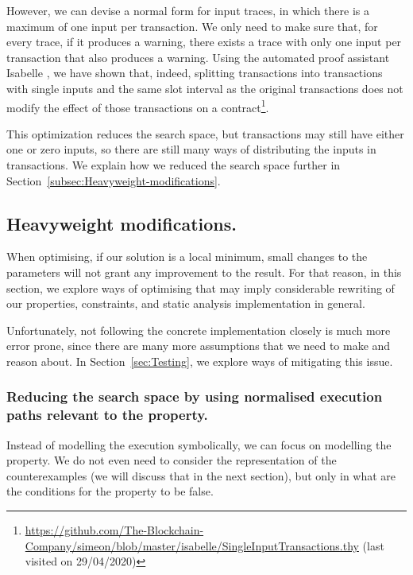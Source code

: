 \documentclass[english,runningheads]{llncs}
\begin{document}
However, we can devise a normal form for input traces, in which there
is a maximum of one input per transaction. We only need to make sure
that, for every trace, if it produces a warning, there exists a trace
with only one input per transaction that also produces a warning.
Using the automated proof assistant Isabelle \cite{nipkow2002isabelle},
we have shown that, indeed, splitting transactions into transactions
with single inputs and the same slot interval as the original transactions
does not modify the effect of those transactions on a contract\footnote{\url{https://github.com/The-Blockchain-Company/simeon/blob/master/isabelle/SingleInputTransactions.thy}
(last visited on 29/04/2020)}.

This optimization reduces the search space, but transactions may still
have either one or zero inputs, so there are still many ways of distributing
the inputs in transactions. We explain how we reduced
the search space further in Section~\ref{subsec:Heavyweight-modifications}. 

\subsection{Heavyweight modifications. \label{subsec:Heavyweight-modifications}}

When optimising, if our solution is a local minimum, small changes
to the parameters will not grant any improvement to the result.
For that reason, in this section, we explore ways of optimising that
may imply considerable rewriting of our properties, constraints, and
static analysis implementation in general.

Unfortunately, not following the concrete implementation closely is
much more error prone, since there are many
more assumptions that we need to make and reason about.
In Section~\ref{sec:Testing}, we explore ways of mitigating this issue.

\subsubsection{Reducing the search space by using normalised execution paths relevant
to the property. \label{subsec:Reducing-search-space-by-using-normalised-execution-paths-relevant-to-the-property}}

Instead of modelling the execution symbolically, we can focus on modelling
the property. We do not even need to consider the
representation of the counterexamples (we will discuss that in the next section),
but only in what are the conditions for the property to be false.
\end{document}
